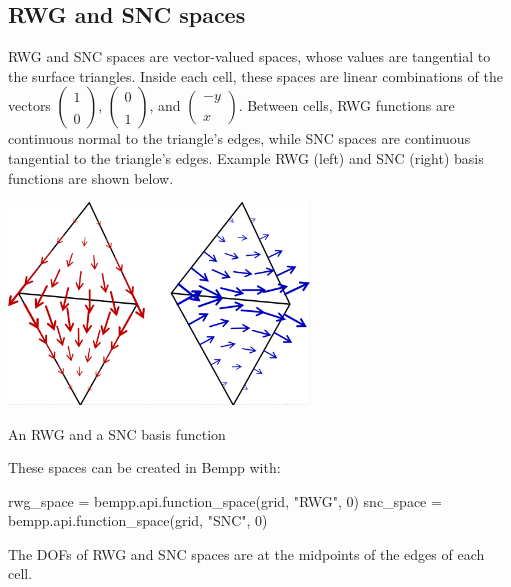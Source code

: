 \documentclass[a4paper]{book}
\begin{document}
\subsection{ RWG and SNC spaces}RWG and SNC spaces are vector-valued spaces, whose values are tangential to the surface triangles.
Inside each cell, these spaces are linear combinations of the vectors
$\left(\begin{array}{c}1\\\\0\end{array}\right)$,
$\left(\begin{array}{c}0\\\\1\end{array}\right)$, and
$\left(\begin{array}{c}-y\\\\x\end{array}\right)$. Between cells, RWG functions are continuous normal
to the triangle's edges, while SNC spaces are continuous tangential to the triangle's edges.
Example RWG (left) and SNC (right) basis functions are shown below.

\begin{center}
\includegraphics[width=0.6\textwidth]{../img/rwg_and_snc.png}

\footnotesize{An RWG and a SNC basis function}\end{center}

These spaces can be created in Bempp with:

\begin{python}
rwg_space = bempp.api.function_space(grid, "RWG", 0)
snc_space = bempp.api.function_space(grid, "SNC", 0)
\end{python}

The DOFs of RWG and SNC spaces are at the midpoints of the edges of each cell.
\end{document}
